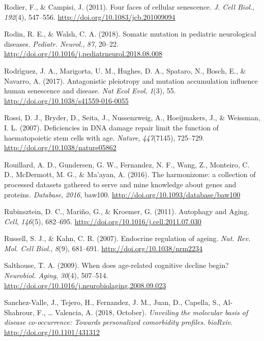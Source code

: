 \documentclass[12pt,twoside]{unicam}
\begin{document}
\begin{cslreferences}
\leavevmode\hypertarget{ref-Rodier2011}{}%
Rodier, F., \& Campisi, J. (2011). Four faces of cellular senescence. \emph{J. Cell Biol.}, \emph{192}(4), 547--556. \url{http://doi.org/10.1083/jcb.201009094}

\leavevmode\hypertarget{ref-Rodin2018}{}%
Rodin, R. E., \& Walsh, C. A. (2018). Somatic mutation in pediatric neurological diseases. \emph{Pediatr. Neurol.}, \emph{87}, 20--22. \url{http://doi.org/10.1016/j.pediatrneurol.2018.08.008}

\leavevmode\hypertarget{ref-Rodriguez2017}{}%
Rodrı́guez, J. A., Marigorta, U. M., Hughes, D. A., Spataro, N., Bosch, E., \& Navarro, A. (2017). Antagonistic pleiotropy and mutation accumulation influence human senescence and disease. \emph{Nat Ecol Evol}, \emph{1}(3), 55. \url{http://doi.org/10.1038/s41559-016-0055}

\leavevmode\hypertarget{ref-Rossi2007}{}%
Rossi, D. J., Bryder, D., Seita, J., Nussenzweig, A., Hoeijmakers, J., \& Weissman, I. L. (2007). Deficiencies in DNA damage repair limit the function of haematopoietic stem cells with age. \emph{Nature}, \emph{447}(7145), 725--729. \url{http://doi.org/10.1038/nature05862}

\leavevmode\hypertarget{ref-Rouillard2016}{}%
Rouillard, A. D., Gundersen, G. W., Fernandez, N. F., Wang, Z., Monteiro, C. D., McDermott, M. G., \& Ma'ayan, A. (2016). The harmonizome: a collection of processed datasets gathered to serve and mine knowledge about genes and proteins. \emph{Database}, \emph{2016}, baw100. \url{http://doi.org/10.1093/database/baw100}

\leavevmode\hypertarget{ref-Rubinsztein2011}{}%
Rubinsztein, D. C., Mariño, G., \& Kroemer, G. (2011). Autophagy and Aging. \emph{Cell}, \emph{146}(5), 682--695. \url{http://doi.org/10.1016/j.cell.2011.07.030}

\leavevmode\hypertarget{ref-Russell2007}{}%
Russell, S. J., \& Kahn, C. R. (2007). Endocrine regulation of ageing. \emph{Nat. Rev. Mol. Cell Biol.}, \emph{8}(9), 681--691. \url{http://doi.org/10.1038/nrm2234}

\leavevmode\hypertarget{ref-Salthouse2009}{}%
Salthouse, T. A. (2009). When does age-related cognitive decline begin? \emph{Neurobiol. Aging}, \emph{30}(4), 507--514. \url{http://doi.org/10.1016/j.neurobiolaging.2008.09.023}

\leavevmode\hypertarget{ref-Sanchez-Valle2018}{}%
Sanchez-Valle, J., Tejero, H., Fernandez, J. M., Juan, D., Capella, S., Al-Shahrour, F., \ldots{} Valencia, A. (2018, October). \emph{Unveiling the molecular basis of disease co-occurrence: Towards personalized comorbidity profiles}. \emph{bioRxiv}. \url{http://doi.org/10.1101/431312}


\end{cslreferences}
\end{document}
